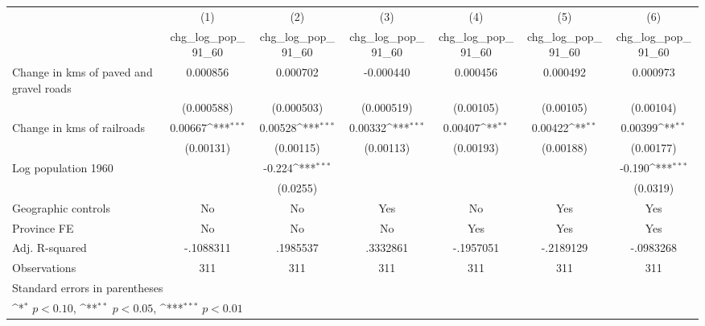 {
\def\sym#1{\ifmmode^{#1}\else\(^{#1}\)\fi}
\begin{tabular}{l*{6}{c}}
\hline\hline
                    &\multicolumn{1}{c}{(1)}&\multicolumn{1}{c}{(2)}&\multicolumn{1}{c}{(3)}&\multicolumn{1}{c}{(4)}&\multicolumn{1}{c}{(5)}&\multicolumn{1}{c}{(6)}\\
                    &\multicolumn{1}{c}{chg\_log\_pop\_91\_60}&\multicolumn{1}{c}{chg\_log\_pop\_91\_60}&\multicolumn{1}{c}{chg\_log\_pop\_91\_60}&\multicolumn{1}{c}{chg\_log\_pop\_91\_60}&\multicolumn{1}{c}{chg\_log\_pop\_91\_60}&\multicolumn{1}{c}{chg\_log\_pop\_91\_60}\\
\hline
Change in kms of paved and gravel roads&    0.000856         &    0.000702         &   -0.000440         &    0.000456         &    0.000492         &    0.000973         \\
                    &  (0.000588)         &  (0.000503)         &  (0.000519)         &   (0.00105)         &   (0.00105)         &   (0.00104)         \\
[1em]
Change in kms of railroads&     0.00667\sym{***}&     0.00528\sym{***}&     0.00332\sym{***}&     0.00407\sym{**} &     0.00422\sym{**} &     0.00399\sym{**} \\
                    &   (0.00131)         &   (0.00115)         &   (0.00113)         &   (0.00193)         &   (0.00188)         &   (0.00177)         \\
[1em]
Log population 1960 &                     &      -0.224\sym{***}&                     &                     &                     &      -0.190\sym{***}\\
                    &                     &    (0.0255)         &                     &                     &                     &    (0.0319)         \\
\hline
Geographic controls &          No         &          No         &         Yes         &          No         &         Yes         &         Yes         \\
Province FE         &          No         &          No         &          No         &         Yes         &         Yes         &         Yes         \\
Adj. R-squared      &   -.1088311         &    .1985537         &    .3332861         &   -.1957051         &   -.2189129         &   -.0983268         \\
Observations        &         311         &         311         &         311         &         311         &         311         &         311         \\
\hline\hline
\multicolumn{7}{l}{\footnotesize Standard errors in parentheses}\\
\multicolumn{7}{l}{\footnotesize \sym{*} \(p<0.10\), \sym{**} \(p<0.05\), \sym{***} \(p<0.01\)}\\
\end{tabular}
}
